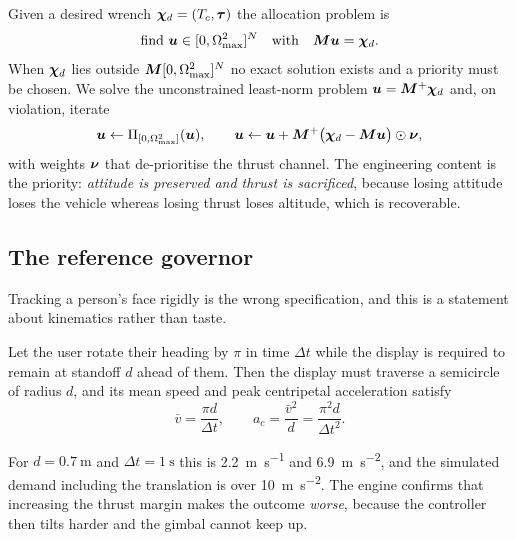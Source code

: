 Given a desired wrench $\bm{\chi}_d = (T_c,\bm{\tau})$ the allocation problem is
\begin{equation}
  \text{find } \bm{u}\in[0,\Omega_{\max}^2]^N
  \quad\text{with}\quad \bm{M}\bm{u} = \bm{\chi}_d .
  \label{eq:allocprob}
\end{equation}
When $\bm{\chi}_d$ lies outside $\bm{M}[0,\Omega_{\max}^2]^N$ no exact solution
exists and a priority must be chosen. We solve the unconstrained least-norm
problem $\bm{u} = \bm{M}^{+}\bm{\chi}_d$ and, on violation, iterate
\begin{equation}
  \bm{u} \leftarrow \Pi_{[0,\Omega_{\max}^2]}(\bm{u}),
  \qquad
  \bm{u} \leftarrow \bm{u} + \bm{M}^{+}
    \big(\bm{\chi}_d - \bm{M}\bm{u}\big)\odot \bm{\nu} ,
  \label{eq:allociter}
\end{equation}
with weights $\bm{\nu}$ that de-prioritise the thrust channel. The
engineering content is the priority: \emph{attitude is preserved and thrust is
sacrificed}, because losing attitude loses the vehicle whereas losing thrust
loses altitude, which is recoverable.

\subsection{The reference governor}

Tracking a person's face rigidly is the wrong specification, and this is a
statement about kinematics rather than taste.

\begin{proposition}
\label{prop:turn}
Let the user rotate their heading by $\pi$ in time $\Delta t$ while the display
is required to remain at standoff $d$ ahead of them. Then the display must
traverse a semicircle of radius $d$, and its mean speed and peak centripetal
acceleration satisfy
\begin{equation}
  \bar v = \frac{\pi d}{\Delta t},
  \qquad
  a_c = \frac{\bar v^2}{d} = \frac{\pi^2 d}{\Delta t^2} .
  \label{eq:turncost}
\end{equation}
\end{proposition}

For $d=\SI{0.7}{\metre}$ and $\Delta t = \SI{1}{\second}$ this is
\SI{2.2}{\metre\per\second} and \SI{6.9}{\metre\per\second\squared}, and the
simulated demand including the translation is over
\SI{10}{\metre\per\second\squared}. The engine confirms that increasing the
thrust margin makes the outcome \emph{worse}, because the controller then tilts
harder and the gimbal cannot keep up.

